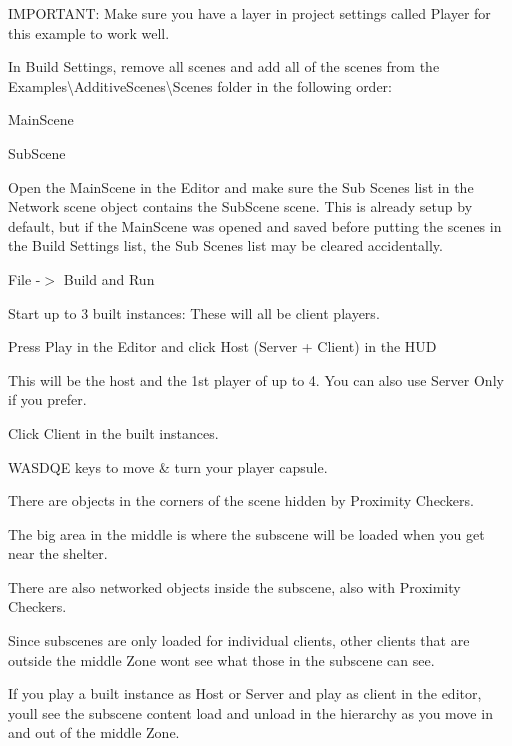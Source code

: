 I\+M\+P\+O\+R\+T\+A\+NT\+: Make sure you have a layer in project settings called Player for this example to work well.

In Build Settings, remove all scenes and add all of the scenes from the Examples\textbackslash{}\+Additive\+Scenes\textbackslash{}\+Scenes folder in the following order\+:
\begin{DoxyItemize}
\item Main\+Scene
\item Sub\+Scene
\end{DoxyItemize}

Open the Main\+Scene in the Editor and make sure the Sub Scenes list in the Network scene object contains the Sub\+Scene scene. This is already setup by default, but if the Main\+Scene was opened and saved before putting the scenes in the Build Settings list, the Sub Scenes list may be cleared accidentally.

File -\/$>$ Build and Run

Start up to 3 built instances\+: These will all be client players.

Press Play in the Editor and click Host (Server + Client) in the H\+UD
\begin{DoxyItemize}
\item This will be the host and the 1st player of up to 4. You can also use Server Only if you prefer.
\end{DoxyItemize}

Click Client in the built instances.
\begin{DoxyItemize}
\item W\+A\+S\+D\+QE keys to move \& turn your player capsule.
\item There are objects in the corners of the scene hidden by Proximity Checkers.
\item The big area in the middle is where the subscene will be loaded when you get near the shelter.
\item There are also networked objects inside the subscene, also with Proximity Checkers.
\item Since subscenes are only loaded for individual clients, other clients that are outside the middle Zone won\textquotesingle{}t see what those in the subscene can see.
\item If you play a built instance as Host or Server and play as client in the editor, you\textquotesingle{}ll see the subscene content load and unload in the hierarchy as you move in and out of the middle Zone. 
\end{DoxyItemize}